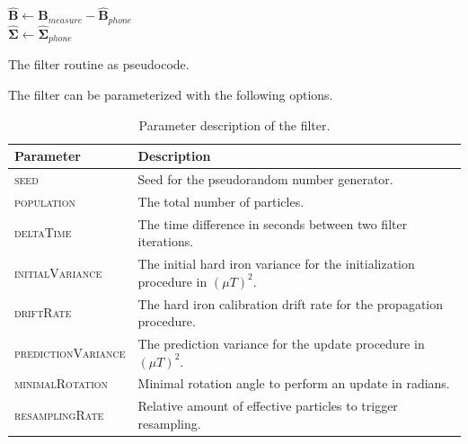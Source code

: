 \begin{algorithm}[h]
	$\bm{\hat{B}} \leftarrow \bm{B}_{measure} - \bm{\hat{B}}_{phone}$\\
    $\bm{\hat{\Sigma}} \leftarrow \bm{\hat{\Sigma}}_{phone}$\\
	\caption{The filter routine as pseudocode.}
	\label{alg:routine}
\end{algorithm}

The filter can be parameterized with the following options.

\begin{table}[h]
    \centering
    \begin{tabular}{ | l | p{10cm} | }
    \hline
    \textbf{Parameter}       & \textbf{Description} \\ \hline
    \textsc{seed}                   & Seed for the pseudorandom number generator. \\ \hline
    \textsc{population}             & The total number of particles. \\ \hline
    \textsc{deltaTime}              & The time difference in seconds between two filter iterations. \\ \hline
    \textsc{initialVariance}        & The initial hard iron variance for the initialization procedure in $(\mu T)^2$. \\ \hline
    \textsc{driftRate}              & The hard iron calibration drift rate for the propagation procedure. \\ \hline
    \textsc{predictionVariance}     & The prediction variance for the update procedure in $(\mu T)^2$. \\ \hline
    \textsc{minimalRotation}        & Minimal rotation angle to perform an update in radians. \\ \hline
    \textsc{resamplingRate}         & Relative amount of effective particles to trigger resampling. \\ \hline
    \end{tabular}
    \caption{Parameter description of the filter.}
    \label{tbl:impl_params}
\end{table}

